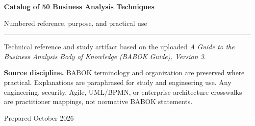 \documentclass[11pt]{article}
\begin{document}
\hypersetup{pageanchor=false}%
\begin{titlepage}
\centering
\vspace*{1.15in}
{\Huge\bfseries\color{BANavy} Catalog of 50 Business Analysis Techniques\par}
\vspace{0.35in}
{\Large\color{BAOrange} Numbered reference, purpose, and practical use\par}
\vspace{0.55in}
\rule{0.78\textwidth}{1.2pt}\par
\vspace{0.35in}
{\large Technical reference and study artifact based on the uploaded \emph{A Guide to the Business Analysis Body of Knowledge (BABOK Guide), Version 3}.\par}
\vfill
\begin{keybox}
\textbf{Source discipline.} BABOK terminology and organization are preserved where practical. Explanations are paraphrased for study and engineering use. Any engineering, security, Agile, UML/BPMN, or enterprise-architecture crosswalks are practitioner mappings, not normative BABOK statements.
\end{keybox}
\vspace{0.35in}
{\small Prepared October 2026\par}
\end{titlepage}\hypersetup{pageanchor=true}
\tableofcontents
\newpage
\end{document}
